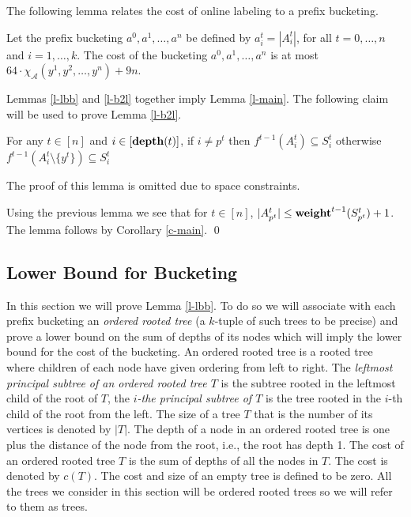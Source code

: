 \documentclass[runningheads,a4paper]{llncs}
\newcommand{\A}{\mathcal{A}}
\newcommand{\weight}{{\rm {\bf weight}}}
\newcommand{\depth}{{\rm {\bf depth}}}
\newenvironment{proofof}[1]{\noindent{\it Proof of #1. }} {{\qed}}
\begin{document}
The following lemma relates the cost of online labeling to a prefix bucketing.
 
\begin{lemma}\label{l-b2l}
Let the prefix bucketing $a^0,a^1,\dots,a^n$ be defined by $a^t_i = |A^t_i|$, for all $t=0,\dots,n$ and $i=1,\dots,k$.
The cost of the bucketing $a^0,a^1,\dots,a^n$ is at most $64 \cdot \chi_\A(y^1,y^2,\dots,y^n) + 9n$.
\end{lemma}

Lemmas \ref{l-lbb} and \ref{l-b2l} together imply Lemma \ref{l-main}. The following claim will be used to prove Lemma  \ref{l-b2l}.

\begin{lemma}\label{l-p2}
For any $t\in[n]$ and $i\in [\depth(t)]$,  if $i\not=p^t$ then $f^{t-1}(A^t_i) \subseteq S^t_i$ otherwise
$f^{t-1}(A^t_i \setminus \{y^t\}) \subseteq S^t_i$ 
\end{lemma}

The proof of this lemma is omitted due to space constraints.

\begin{proofof}{Lemma \ref{l-b2l}}
Using the previous lemma we see that for $t\in [n]$, $|A^t_{p^t}| \le \weight^{t-1}(S^t_{p^t}) + 1$.
The lemma follows by Corollary \ref{c-main}.
\end{proofof}


\subsection{Lower Bound for Bucketing}\label{s-lbb}

In this section we will prove Lemma \ref{l-lbb}. To do so we will associate with each prefix bucketing an \emph{ordered rooted tree} (a $k$-tuple of such trees to be precise) 
and prove a lower bound on the sum of depths of its nodes which will imply the lower bound for the cost of the bucketing.
An ordered rooted tree is a rooted tree where children of each node have given ordering from left to right.
The \emph{leftmost principal subtree of an ordered rooted tree $T$} is the subtree rooted in the leftmost child of the root of $T$, the \emph{$i$-the principal subtree of $T$} is the 
tree rooted in the $i$-th child of the root from the left. The size of a tree $T$ that is the number 
of its vertices is denoted by $|T|$. The depth of a node in an ordered rooted tree is one plus the distance of the node from the root, i.e., the root has depth 1. The cost
of an ordered rooted tree $T$ is the sum of depths of all the nodes in $T$. The cost is denoted by $c(T)$. The cost and size of an empty tree is defined to be zero.
All the trees we consider in this section will be ordered rooted trees so we will refer to them as trees.
\end{document}
